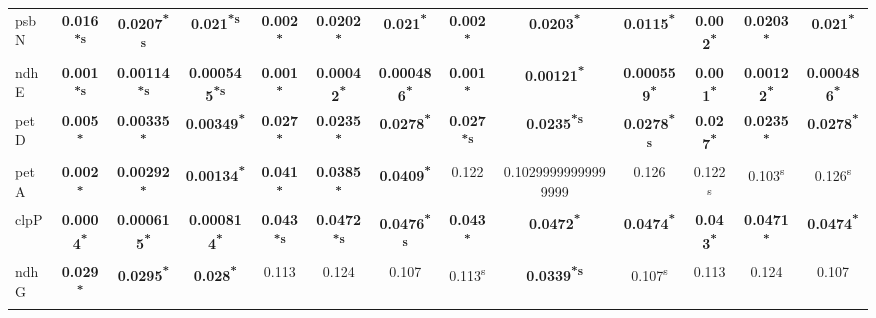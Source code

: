 \documentclass[a4paper]{article}
\begin{document}
\begin{longtable}{l|c|c|c|c|c|c|c|c|c|c|c|c}
psbN&\textbf{0.016\textsuperscript{*}\textsuperscript{s}}&\textbf{0.0207\textsuperscript{*}\textsuperscript{s}}&\textbf{0.021\textsuperscript{*}\textsuperscript{s}}&\textbf{0.002\textsuperscript{*}}&\textbf{0.0202\textsuperscript{*}}&\textbf{0.021\textsuperscript{*}}&\textbf{0.002\textsuperscript{*}}&\textbf{0.0203\textsuperscript{*}}&\textbf{0.0115\textsuperscript{*}}&\textbf{0.002\textsuperscript{*}}&\textbf{0.0203\textsuperscript{*}}&\textbf{0.021\textsuperscript{*}}\\
ndhE&\textbf{0.001\textsuperscript{*}\textsuperscript{s}}&\textbf{0.00114\textsuperscript{*}\textsuperscript{s}}&\textbf{0.000545\textsuperscript{*}\textsuperscript{s}}&\textbf{0.001\textsuperscript{*}}&\textbf{0.00042\textsuperscript{*}}&\textbf{0.000486\textsuperscript{*}}&\textbf{0.001\textsuperscript{*}}&\textbf{0.00121\textsuperscript{*}}&\textbf{0.000559\textsuperscript{*}}&\textbf{0.001\textsuperscript{*}}&\textbf{0.00122\textsuperscript{*}}&\textbf{0.000486\textsuperscript{*}}\\
petD&\textbf{0.005\textsuperscript{*}}&\textbf{0.00335\textsuperscript{*}}&\textbf{0.00349\textsuperscript{*}}&\textbf{0.027\textsuperscript{*}}&\textbf{0.0235\textsuperscript{*}}&\textbf{0.0278\textsuperscript{*}}&\textbf{0.027\textsuperscript{*}\textsuperscript{s}}&\textbf{0.0235\textsuperscript{*}\textsuperscript{s}}&\textbf{0.0278\textsuperscript{*}\textsuperscript{s}}&\textbf{0.027\textsuperscript{*}}&\textbf{0.0235\textsuperscript{*}}&\textbf{0.0278\textsuperscript{*}}\\
petA&\textbf{0.002\textsuperscript{*}}&\textbf{0.00292\textsuperscript{*}}&\textbf{0.00134\textsuperscript{*}}&\textbf{0.041\textsuperscript{*}}&\textbf{0.0385\textsuperscript{*}}&\textbf{0.0409\textsuperscript{*}}&0.122&0.10299999999999999&0.126&0.122\textsuperscript{s}&0.103\textsuperscript{s}&0.126\textsuperscript{s}\\
clpP&\textbf{0.0004\textsuperscript{*}}&\textbf{0.000615\textsuperscript{*}}&\textbf{0.000814\textsuperscript{*}}&\textbf{0.043\textsuperscript{*}\textsuperscript{s}}&\textbf{0.0472\textsuperscript{*}\textsuperscript{s}}&\textbf{0.0476\textsuperscript{*}\textsuperscript{s}}&\textbf{0.043\textsuperscript{*}}&\textbf{0.0472\textsuperscript{*}}&\textbf{0.0474\textsuperscript{*}}&\textbf{0.043\textsuperscript{*}}&\textbf{0.0471\textsuperscript{*}}&\textbf{0.0474\textsuperscript{*}}\\
ndhG&\textbf{0.029\textsuperscript{*}}&\textbf{0.0295\textsuperscript{*}}&\textbf{0.028\textsuperscript{*}}&0.113&0.124&0.107&0.113\textsuperscript{s}&\textbf{0.0339\textsuperscript{*}\textsuperscript{s}}&0.107\textsuperscript{s}&0.113&0.124&0.107\\

\end{longtable}
\end{document}
